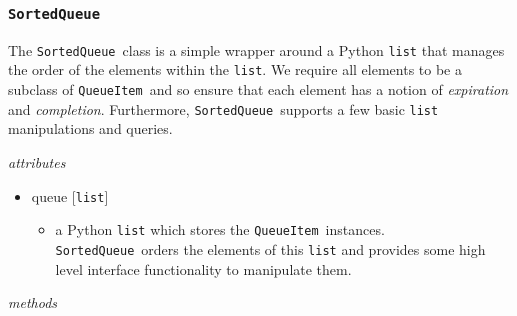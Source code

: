 \documentclass{article}
\newcommand{\SortedQueue}{\texttt{SortedQueue}~}
\newcommand{\QueueItem}{\texttt{QueueItem}~}
\begin{document}

\subsubsection{\SortedQueue}
\label{sec: SortedQueue}

The \SortedQueue class is a simple wrapper around a Python \texttt{list} that manages the order of the elements within the \texttt{list}.
We require all elements to be a subclass of \QueueItem and so ensure that each element has a notion of \textit{expiration} and \textit{completion}.
Furthermore, \SortedQueue supports a few basic \texttt{list} manipulations and queries.

\vspace{0.5cm}
\noindent
\textit{attributes}

\begin{itemize}
    \item{queue [\texttt{list}]
        \begin{itemize}
            \item{a Python \texttt{list} which stores the \QueueItem instances. \SortedQueue orders the elements of this \texttt{list} and provides some high level interface functionality to manipulate them.}
        \end{itemize}
         }
\end{itemize}

\noindent
\textit{methods}
\end{document}
